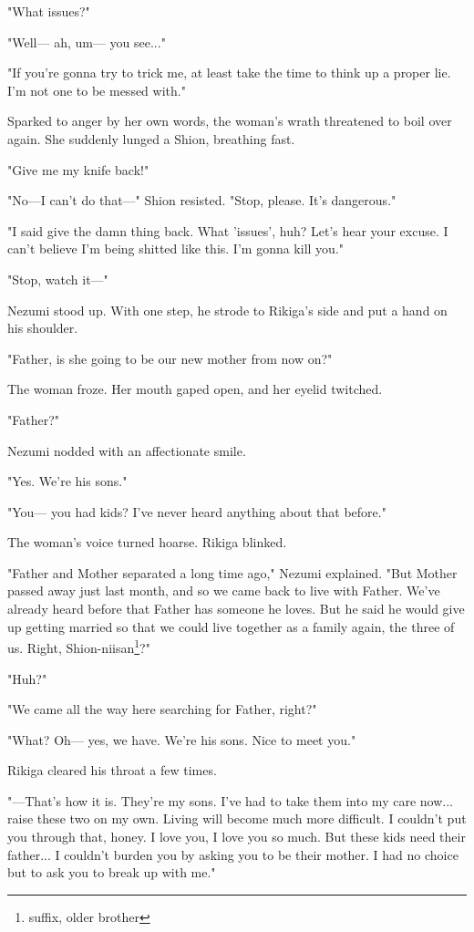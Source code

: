 "What issues?"

"Well--- ah, um--- you see..."

"If you're gonna try to trick me, at least take the time to think up a
proper lie. I'm not one to be messed with."

Sparked to anger by her own words, the woman's wrath threatened to boil
over again. She suddenly lunged a Shion, breathing fast.

"Give me my knife back!"

"No---I can't do that---" Shion resisted. "Stop, please. It's dangerous."

"I said give the damn thing back. What 'issues', huh? Let's hear your
excuse. I can't believe I'm being shitted like this. I'm gonna kill
you."

"Stop, watch it---"

Nezumi stood up. With one step, he strode to Rikiga's side and put a
hand on his shoulder.

"Father, is she going to be our new mother from now on?"

The woman froze. Her mouth gaped open, and her eyelid twitched.

"Father?"

Nezumi nodded with an affectionate smile.

"Yes. We're his sons."

"You--- you had kids? I've never heard anything about that before."

The woman's voice turned hoarse. Rikiga blinked.

"Father and Mother separated a long time ago," Nezumi explained. "But
Mother passed away just last month, and so we came back to live with
Father. We've already heard before that Father has someone he loves. But
he said he would give up getting married so that we could live together
as a family again, the three of us. Right, Shion-niisan\footnote{suffix, older brother}?"

"Huh?"

"We came all the way here searching for Father, right?"

"What? Oh--- yes, we have. We're his sons. Nice to meet you."

Rikiga cleared his throat a few times.

"---That's how it is. They're my sons. I've had to take them into my care
now... raise these two on my own. Living will become much more
difficult. I couldn't put you through that, honey. I love you, I love
you so much. But these kids need their father... I couldn't burden you
by asking you to be their mother. I had no choice but to ask you to
break up with me."

